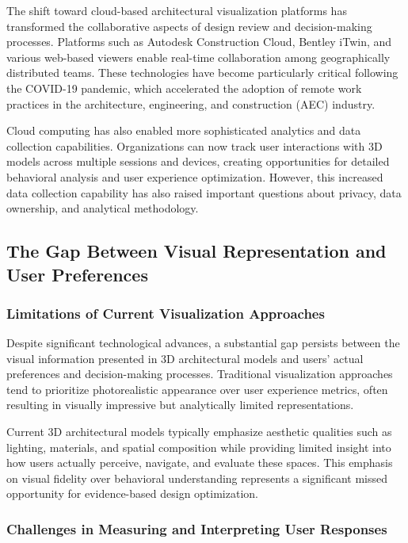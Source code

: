 The shift toward cloud-based architectural visualization platforms has transformed the collaborative aspects of design review and decision-making processes. Platforms such as Autodesk Construction Cloud, Bentley iTwin, and various web-based viewers enable real-time collaboration among geographically distributed teams. These technologies have become particularly critical following the COVID-19 pandemic, which accelerated the adoption of remote work practices in the architecture, engineering, and construction (AEC) industry.

Cloud computing has also enabled more sophisticated analytics and data collection capabilities. Organizations can now track user interactions with 3D models across multiple sessions and devices, creating opportunities for detailed behavioral analysis and user experience optimization. However, this increased data collection capability has also raised important questions about privacy, data ownership, and analytical methodology.

\subsection{The Gap Between Visual Representation and User Preferences}
\label{subsec:gap_visual_preferences}

\subsubsection{Limitations of Current Visualization Approaches}
\label{subsubsec:visualization_limitations}

Despite significant technological advances, a substantial gap persists between the visual information presented in 3D architectural models and users' actual preferences and decision-making processes. Traditional visualization approaches tend to prioritize photorealistic appearance over user experience metrics, often resulting in visually impressive but analytically limited representations.

Current 3D architectural models typically emphasize aesthetic qualities such as lighting, materials, and spatial composition while providing limited insight into how users actually perceive, navigate, and evaluate these spaces. This emphasis on visual fidelity over behavioral understanding represents a significant missed opportunity for evidence-based design optimization.

\subsubsection{Challenges in Measuring and Interpreting User Responses}
\label{subsubsec:measuring_user_responses}

